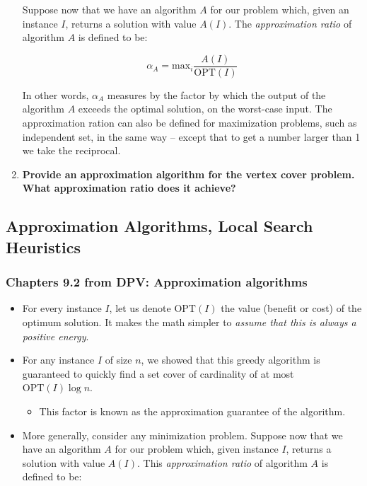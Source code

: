 \documentclass[a4paper,11pt]{article}
\begin{document}
\begin{enumerate}
  Suppose now that we have an algorithm $A$ for our problem which, given
  an instance $I$, returns a solution with value $A(I)$. The
  \emph{approximation ratio} of algorithm $A$ is defined to be:

  \[\alpha_{A} = \text{max}_{i} \frac{A(I)}{\text{OPT}(I)}\]

  In other words, $\alpha_{A}$ measures by the factor by which the
  output of the algorithm $A$ exceeds the optimal solution, on the
  worst-case input. The approximation ration can also be defined for
  maximization problems, such as independent set, in the same way --
  except that to get a number larger than 1 we take the reciprocal.
\item
  \textbf{Provide an approximation algorithm for the vertex cover
  problem. What approximation ratio does it achieve?}
\end{enumerate}

\subsection{Approximation Algorithms, Local Search
Heuristics}\label{approximation-algorithms-local-search-heuristics}

\subsubsection{Chapters 9.2 from DPV: Approximation
algorithms}\label{chapters-9.2-from-dpv-approximation-algorithms}

\begin{itemize}
\itemsep1pt\parskip0pt
\item
  For every instance $I$, let us denote $\text{OPT}(I)$ the value
  (benefit or cost) of the optimum solution. It makes the math simpler
  to \emph{assume that this is always a positive energy}.
\item
  For any instance $I$ of size $n$, we showed that this greedy algorithm
  is guaranteed to quickly find a set cover of cardinality of at most
  $\text{OPT}(I)\log n$.

  \begin{itemize}
  \itemsep1pt\parskip0pt
  \item
    This factor is known as the approximation guarantee of the
    algorithm.
  \end{itemize}
\item
  More generally, consider any minimization problem. Suppose now that we
  have an algorithm $A$ for our problem which, given instance $I$,
  returns a solution with value $A(I)$. This \emph{approximation ratio}
  of algorithm $A$ is defined to be:
\end{itemize}
\end{document}
